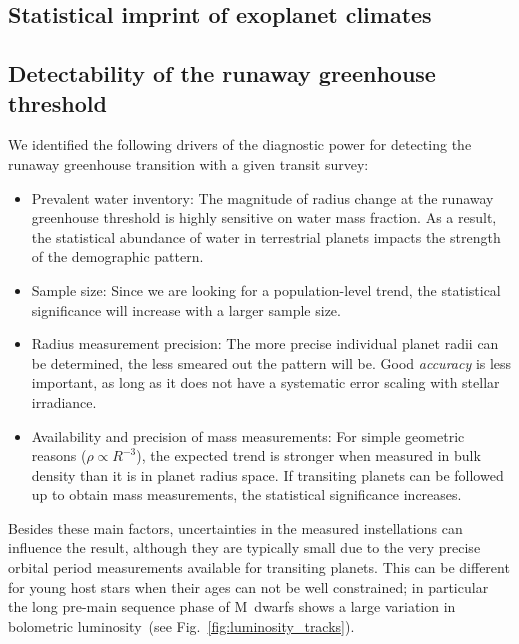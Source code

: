 \documentclass[twocolumn]{aastex631}
\begin{document}
\subsection{Statistical imprint of exoplanet climates}

\subsection{Detectability of the runaway greenhouse threshold}

We identified the following drivers of the diagnostic power for detecting the runaway greenhouse transition with a given transit survey:
\begin{itemize}
    \item Prevalent water inventory: The magnitude of radius change at the runaway greenhouse threshold is highly sensitive on water mass fraction. As a result, the statistical abundance of water in terrestrial planets impacts the strength of the demographic pattern.
    \item Sample size: Since we are looking for a population-level trend, the statistical significance will increase with a larger sample size.
    \item Radius measurement precision: The more precise individual planet radii can be determined, the less smeared out the pattern will be. Good \textit{accuracy} is less important, as long as it does not have a systematic error scaling with stellar irradiance.
    \item Availability and precision of mass measurements: For simple geometric reasons ($\rho \propto R^{-3}$), the expected trend is stronger when measured in bulk density than it is in planet radius space. If transiting planets can be followed up to obtain mass measurements, the statistical significance increases.
\end{itemize}
Besides these main factors, uncertainties in the measured instellations can influence the result, although they are typically small due to the very precise orbital period measurements available for transiting planets.
This can be different for young host stars when their ages can not be well constrained; in particular the long pre-main sequence phase of M~dwarfs shows a large variation in bolometric luminosity~(see Fig.~\ref{fig:luminosity_tracks}).
\end{document}
